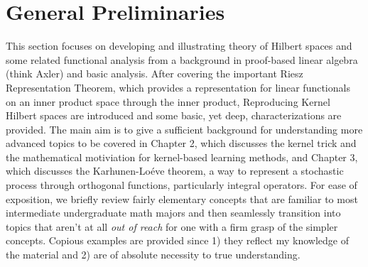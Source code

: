 \documentclass[psamsfonts]{amsart}
\theoremstyle{definition}
\theoremstyle{remark}
\numberwithin{equation}{section}
\begin{document}
\section{General Preliminaries} This section focuses on developing and illustrating theory of Hilbert spaces and some related functional analysis from a background in proof-based linear algebra (think Axler) and basic analysis. After covering the important Riesz Representation Theorem, which provides a representation for linear functionals on an inner product space through the inner product, Reproducing Kernel Hilbert spaces are introduced and some basic, yet deep, characterizations are provided. The main aim is to give a sufficient background for understanding more advanced topics to be covered in Chapter 2, which discusses the kernel trick and the mathematical motiviation for kernel-based learning methods, and Chapter 3, which discusses the Karhunen-Lo\'{e}ve theorem, a way to represent a stochastic process through orthogonal functions, particularly integral operators. For ease of exposition, we briefly review fairly elementary concepts that are familiar to most intermediate undergraduate math majors and then seamlessly transition into topics that aren't at all \textit{out of reach} for one with a firm grasp of the simpler concepts. Copious examples are provided since 1) they reflect my knowledge of the material and 2) are of absolute necessity to true understanding. 
\end{document}
